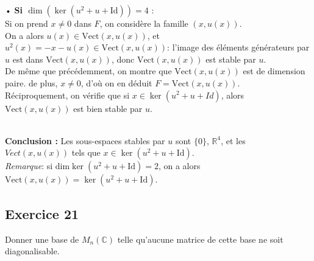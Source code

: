 \documentclass[a4paper,12pt]{article}
\begin{document}
\begin{correctionbox}
\begin{itemize}
                • \textbf{Si \( \dim(\ker(u^2 + u + \mathrm{Id})) = 4 \)} : \\
                Si on prend $x \not = 0$ dans $F$, on considère la famille $(x, u(x))$. \\
                On a alors $u(x) \in \mathrm{Vect}(x, u(x))$, et $u^2(x) = -x-u(x) \in \mathrm{Vect}(x, u(x))$: l'image des éléments générateurs par $u$ est dans $\mathrm{Vect}(x, u(x))$, donc $\mathrm{Vect}(x, u(x))$ est stable par $u$. \\
                De même que précédemment, on montre que $\mathrm{Vect}(x, u(x))$ est de dimension paire. de plus, $x \not = 0$, d'où on en déduit $F = \mathrm{Vect}(x, u(x))$. \\
                Réciproquement, on vérifie que si $x \in \ker (u^2 + u + Id)$, alors $\mathrm{Vect}(x, u(x))$ est bien stable par $u$.
                \\\\
        \end{itemize}
        \textbf{Conclusion :} Les sous-espaces stables par \( u \) sont \( \{0\} \), \( \mathbb{R}^4 \), et les \(Vect(x,u(x)) \) tels que \( x \in\ker(u^2 + u + \mathrm{Id}) \). \\
        \textit{Remarque}: si $\mathrm{dim} \ker (u^2 + u + \mathrm{Id}) = 2$, on a alors $\mathrm{Vect}(x, u(x)) = \ker (u^2 + u + \mathrm{Id})$.
    \end{correctionbox}



    \subsection*{Exercice 21}
    Donner une base de \( M_n(\mathbb{C}) \) telle qu'aucune matrice de cette base ne soit diagonalisable.
    
\end{document}
